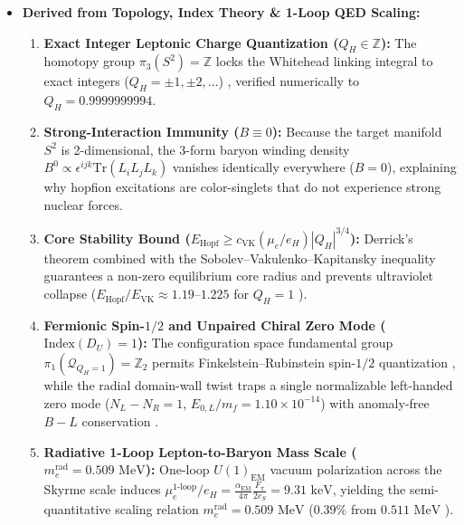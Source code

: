 \documentclass[10pt,aps,prd,twocolumn,superscriptaddress,nofootinbib,floatfix,longbibliography,showkeys]{revtex4-2}
\begin{document}
\begin{itemize}
  \item \textbf{Derived from Topology, Index Theory \& 1-Loop QED Scaling:}
  \begin{enumerate}
    \item \textbf{Exact Integer Leptonic Charge Quantization ($Q_H \in \mathbb{Z}$):} The homotopy group $\pi_3(S^2) = \mathbb{Z}$ locks the Whitehead linking integral to exact integers ($Q_H = \pm 1, \pm 2, \dots$) \cite{ref38}, verified numerically to $Q_H = 0.9999999994$.
    \item \textbf{Strong-Interaction Immunity ($B \equiv 0$):} Because the target manifold $S^2$ is 2-dimensional, the 3-form baryon winding density $B^0 \propto \epsilon^{ijk}\text{Tr}(L_i L_j L_k)$ vanishes identically everywhere ($B = 0$), explaining why hopfion excitations are color-singlets that do not experience strong nuclear forces.
    \item \textbf{Core Stability Bound ($E_{\text{Hopf}} \ge c_{\text{VK}}(\mu_e/e_H)|Q_H|^{3/4}$):} Derrick's theorem \cite{ref18} combined with the Sobolev--Vakulenko--Kapitansky inequality \cite{ref39,ref40,ref41,ref42} guarantees a non-zero equilibrium core radius and prevents ultraviolet collapse ($E_{\text{Hopf}}/E_{\text{VK}} \approx 1.19\text{--}1.225$ for $Q_H = 1$ \cite{ref44,ref45,ref46}).
    \item \textbf{Fermionic Spin-$1/2$ and Unpaired Chiral Zero Mode ($\text{Index}(D_U) = 1$):} The configuration space fundamental group $\pi_1(\mathcal{Q}_{Q_H=1}) = \mathbb{Z}_2$ permits Finkelstein--Rubinstein spin-$1/2$ quantization \cite{ref11}, while the radial domain-wall twist traps a single normalizable left-handed zero mode ($N_L - N_R = 1$, $E_{0,L}/m_f = 1.10 \times 10^{-14}$) with anomaly-free $B - L$ conservation \cite{ref35,ref36,ref37}.
    \item \textbf{Radiative 1-Loop Lepton-to-Baryon Mass Scale ($m_e^{\text{rad}} = 0.509\text{ MeV}$):} One-loop $U(1)_{\text{EM}}$ vacuum polarization across the Skyrme scale induces $\mu_e^{\text{1-loop}}/e_H = \frac{\alpha_{\text{EM}}}{4\pi}\frac{F_\pi}{2 e_S} = 9.31\text{ keV}$, yielding the semi-quantitative scaling relation $m_e^{\text{rad}} = 0.509\text{ MeV}$ ($0.39\%$ from $0.511\text{ MeV}$ \cite{ref19,ref20}).


\end{enumerate}
\end{itemize}
\end{document}
